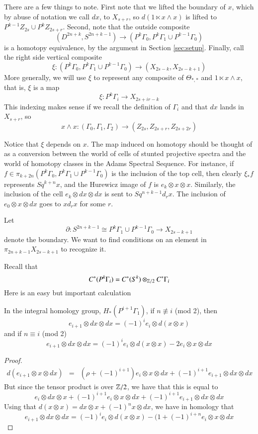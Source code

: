 There are a few things to note.  
First note that we lifted the boundary of $x$, which by abuse of notation we call $dx$, to $X_{s+r}$, so $d(1\ltimes x\wedge x)$ is lifted to $P^{k-1}Z_{2s}\cup P^kZ_{2s+r}$.
Second, note that the outside composite
\[(D^{2n+k},S^{2n+k-1})\to   (P^k\Gamma_0,P^k\Gamma_1\cup P^{k-1}\Gamma_0)\]
is a homotopy equivalence, by the argument in Section \ref{sec:setup}.
Finally, call the right side vertical composite 
\[\xi : (P^k\Gamma_0,P^k\Gamma_1\cup P^{k-1}\Gamma_0) \to (X_{2s-k},X_{2s-k+1})\]
More generally, we will use $\xi$ to represent any composite of $\Theta_{*,*}$ and $1\ltimes x\wedge x$, that is, $\xi$ is a map
\[\xi : P^k\Gamma_i\to X_{2s+ir-k}\]
This indexing makes sense if we recall the definition of $\Gamma_i$ and that $dx$ lands in $X_{s+r}$, so 
\[x\wedge x: (\Gamma_0,\Gamma_1,\Gamma_2)\to (Z_{2s},Z_{2s+r},Z_{2s+2r})\]

\begin{Remark}
  \label{sec:xirem}
  Notice that $\xi$ depends on $x$.  The map induced on homotopy should be thought of as a conversion between the world of cells of stunted projective spectra and the world of homotopy classes in the Adams Spectral Sequence.  
  For instance, if $f\in \pi_{k+2n}(P^k\Gamma_0,P^k\Gamma_1\cup P^{k-1}\Gamma_0)$ is the inclusion of the top cell, then clearly $\xi_*f$ represents $Sq^{k+n}x$, and the Hurewicz image of $f$ is $e_k\otimes x\otimes x$.  Similarly, the inclusion of the cell $e_{k}\otimes dx\otimes dx$ is sent to $Sq^{n+k-1}d_r x$.  The inclusion of $e_0\otimes x\otimes dx$ goes to $xd_r x$ for some $r$.  
\end{Remark}


Let 
\[\partial:S^{2n+k-1}\cong P^k\Gamma_1\cup P^{k-1}\Gamma_0 \to X_{2s-k+1}\]
denote the boundary.  
We want to find conditions on an element in $\pi_{2n+k-1}X_{2s-k+1}$ to recognize it.  

Recall that
\[C^*(P^k\Gamma_i)=C^*(S^k)\otimes_{\mathbb{Z}/2} C^*\Gamma_i\]
Here is an easy but important calculation
\begin{Lemma}
  \label{sec:elemma}
  In the integral homology group, $H_*(P^{i+1}\Gamma_1)$, if $n\not\equiv i$ (mod 2), then
  \[e_{i+1}\otimes dx\otimes dx = (-1)^ie_i\otimes d(x\otimes x)\]
  and if $n\equiv i$ (mod 2)
  \[e_{i+1}\otimes dx\otimes dx = (-1)^ie_i\otimes d(x\otimes x)-2e_i\otimes x\otimes dx\]
\end{Lemma}

\begin{proof}
  \begin{eqnarray*}
    d(e_{i+1}\otimes x\otimes dx)  &=& 
    (\rho+(-1)^{i+1})e_i\otimes x\otimes dx + (-1)^{i+1}e_{i+1}\otimes dx\otimes dx
  \end{eqnarray*}
  But since the tensor product is over $\mathbb{Z}/2$, we have that this is equal to
  \[e_i\otimes dx \otimes x + (-1)^{i+1}e_i\otimes x\otimes dx + (-1)^{i+1}e_{i+1}\otimes dx\otimes dx\]
  Using that $d(x\otimes x)=dx\otimes x + (-1)^n x\otimes dx$, we have in homology that
  \[e_{i+1}\otimes dx\otimes dx = (-1)^ie_i\otimes d(x\otimes x) - (1+(-1)^{i+n}e_i\otimes x\otimes dx\]
\end{proof}

